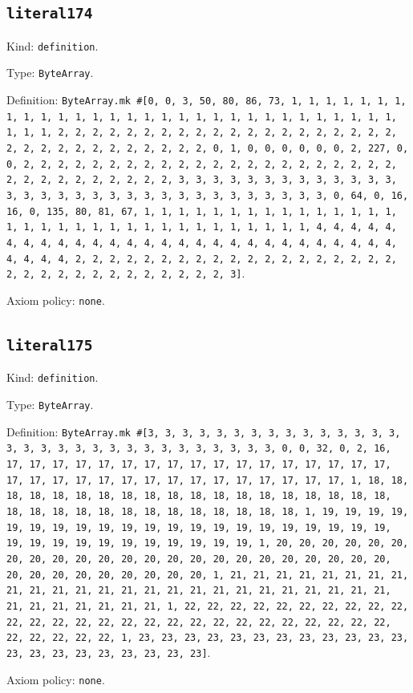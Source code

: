 \documentclass[11pt]{article}
\begin{document}
\subsection*{\texttt{literal174}}
\noindent Kind: \texttt{definition}.\par
\noindent Type: \texttt{ByteArray}.\par
\noindent Definition: \texttt{ByteArray.mk \#[0, 0, 3, 50, 80, 86, 73, 1, 1, 1, 1, 1, 1, 1, 1, 1, 1, 1, 1, 1, 1, 1, 1, 1, 1, 1, 1, 1, 1, 1, 1, 1, 1, 1, 1, 1, 1, 1, 1, 1, 2, 2, 2, 2, 2, 2, 2, 2, 2, 2, 2, 2, 2, 2, 2, 2, 2, 2, 2, 2, 2, 2, 2, 2, 2, 2, 2, 2, 2, 2, 2, 2, 0, 1, 0, 0, 0, 0, 0, 0, 2, 227, 0, 0, 2, 2, 2, 2, 2, 2, 2, 2, 2, 2, 2, 2, 2, 2, 2, 2, 2, 2, 2, 2, 2, 2, 2, 2, 2, 2, 2, 2, 2, 2, 2, 2, 3, 3, 3, 3, 3, 3, 3, 3, 3, 3, 3, 3, 3, 3, 3, 3, 3, 3, 3, 3, 3, 3, 3, 3, 3, 3, 3, 3, 3, 3, 3, 3, 0, 64, 0, 16, 16, 0, 135, 80, 81, 67, 1, 1, 1, 1, 1, 1, 1, 1, 1, 1, 1, 1, 1, 1, 1, 1, 1, 1, 1, 1, 1, 1, 1, 1, 1, 1, 1, 1, 1, 1, 1, 1, 1, 4, 4, 4, 4, 4, 4, 4, 4, 4, 4, 4, 4, 4, 4, 4, 4, 4, 4, 4, 4, 4, 4, 4, 4, 4, 4, 4, 4, 4, 4, 4, 4, 2, 2, 2, 2, 2, 2, 2, 2, 2, 2, 2, 2, 2, 2, 2, 2, 2, 2, 2, 2, 2, 2, 2, 2, 2, 2, 2, 2, 2, 2, 2, 2, 3]}.\par
\noindent Axiom policy: \texttt{none}.\par
\subsection*{\texttt{literal175}}
\noindent Kind: \texttt{definition}.\par
\noindent Type: \texttt{ByteArray}.\par
\noindent Definition: \texttt{ByteArray.mk \#[3, 3, 3, 3, 3, 3, 3, 3, 3, 3, 3, 3, 3, 3, 3, 3, 3, 3, 3, 3, 3, 3, 3, 3, 3, 3, 3, 3, 3, 3, 3, 0, 0, 32, 0, 2, 16, 17, 17, 17, 17, 17, 17, 17, 17, 17, 17, 17, 17, 17, 17, 17, 17, 17, 17, 17, 17, 17, 17, 17, 17, 17, 17, 17, 17, 17, 17, 17, 17, 1, 18, 18, 18, 18, 18, 18, 18, 18, 18, 18, 18, 18, 18, 18, 18, 18, 18, 18, 18, 18, 18, 18, 18, 18, 18, 18, 18, 18, 18, 18, 18, 18, 1, 19, 19, 19, 19, 19, 19, 19, 19, 19, 19, 19, 19, 19, 19, 19, 19, 19, 19, 19, 19, 19, 19, 19, 19, 19, 19, 19, 19, 19, 19, 19, 19, 1, 20, 20, 20, 20, 20, 20, 20, 20, 20, 20, 20, 20, 20, 20, 20, 20, 20, 20, 20, 20, 20, 20, 20, 20, 20, 20, 20, 20, 20, 20, 20, 20, 1, 21, 21, 21, 21, 21, 21, 21, 21, 21, 21, 21, 21, 21, 21, 21, 21, 21, 21, 21, 21, 21, 21, 21, 21, 21, 21, 21, 21, 21, 21, 21, 21, 1, 22, 22, 22, 22, 22, 22, 22, 22, 22, 22, 22, 22, 22, 22, 22, 22, 22, 22, 22, 22, 22, 22, 22, 22, 22, 22, 22, 22, 22, 22, 22, 22, 1, 23, 23, 23, 23, 23, 23, 23, 23, 23, 23, 23, 23, 23, 23, 23, 23, 23, 23, 23, 23, 23]}.\par
\noindent Axiom policy: \texttt{none}.\par
\end{document}
